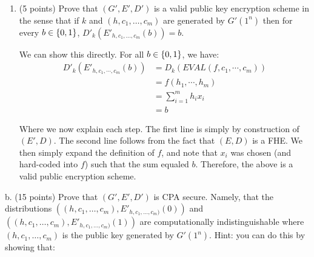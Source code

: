 \documentclass{article}
\begin{document}
\begin{enumerate}[,label=\alph*.]%

\item{}
(5 points) Prove that $(G',E',D')$ is a valid public key encryption scheme in the sense that if $k$ and $(h,c_1,\ldots,c_m)$ are generated by $G'(1^n)$ then for every $b\in\{0,1\}$, $D'_k(E'_{h,c_1,\ldots,c_m}(b))=b$.%

We can show this directly. For all $b \in \{0,1\}$, we have:%
\noindent\noindent\[%
\begin{aligned}
  D'_k(E'_{h,c_1,\cdots,c_m}(b)) &= D_k(EVAL(f, c_1,\cdots,c_m)) \\
  &= f(h_1,\cdots,h_m) \\
  &= \sum_{i = 1}^m h_ix_i \\
  &= b
\end{aligned} 
\]%

Where we now explain each step. The first line is simply by construction of $(E',D)$. The second
line follows from the fact that $(E,D)$ is a FHE. We then simply expand the definition of $f$, and
note that $x_i$ was chosen (and hard-coded into $f$) such that the sum equaled $b$. Therefore,
the above is a valid public encryption scheme.%
\end{enumerate}%

\noindent{}b.  (15 points) Prove that $(G',E',D')$ is  CPA secure. Namely, that the distributions $((h,c_1,\ldots,c_m),E'_{h,c_1,\ldots,c_m)}(0))$ and $((h,c_1,\ldots,c_m),E'_{h,c_1,\ldots,c_m)}(1))$ are computationally indistinguishable where $(h,c_1,\ldots,c_m)$ is the public key generated by $G'(1^n)$.
Hint: you can do this by showing that:%
\end{document}
